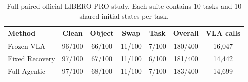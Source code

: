 \begin{table}
\caption{Full paired official LIBERO-PRO study. Each suite contains 10 tasks and 10 shared initial states per task.}
\label{tab:libero_pro_full}
\centering\footnotesize
\begin{tabular}{lcccccc}
\toprule
Method & Clean & Object & Swap & Task & Overall & VLA calls \\
\midrule
Frozen VLA & 96/100 & 66/100 & 11/100 & 7/100 & 180/400 & 16,047 \\
Fixed Recovery & 97/100 & 67/100 & 11/100 & 6/100 & 181/400 & 14,442 \\
Full Agentic & 97/100 & 68/100 & 11/100 & 7/100 & 183/400 & 14,699 \\
\bottomrule
\end{tabular}
\end{table}
